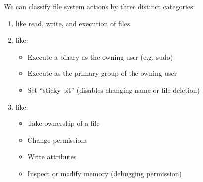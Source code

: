 \documentclass[code]{amznotes}
\begin{document}
We can classify file system actions by three distinct categories:
\begin{enumerate}
    \item {} like read, write, and execution of files.
    \item {} like:
    \begin{itemize}[noitemsep]
        \item Execute a binary as the owning user (e.g. sudo)
        \item Execute as the primary group of the owning user
        \item Set ``sticky bit'' (disables changing name or file deletion)
    \end{itemize}
    \item {} like:
    \begin{itemize}[noitemsep]
        \item Take ownership of a file
        \item Change permissions
        \item Write attributes
        \item Inspect or modify memory (debugging permission)
    \end{itemize}
\end{enumerate}


\end{document}
